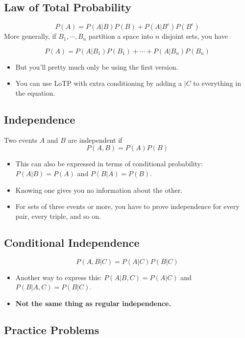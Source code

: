 \documentclass{article}
\begin{document}
\subsection{Law of Total Probability}

$$P(A) = P(A|B)P(B) + P(A|B^c)P(B^c)$$
More generally, if $B_1, \cdots, B_n$ partition a space into $n$ disjoint sets, you have 

$$P(A) = P(A|B_1)P(B_1) + \cdots + P(A|B_n)P(B_n)$$
\begin{itemize}
    \item But you'll pretty much only be using the first version.
    \item You can use LoTP with extra conditioning by adding a $|C$ to everything in the equation.
\end{itemize}

\subsection{Independence}

Two events $A$ and $B$ are independent if $$P(A, B) = P(A)P(B)$$

\begin{itemize}
    \item This can also be expressed in terms of conditional probability: $P(A|B) = P(A)$ and $P(B|A) = P(B)$.
    \item Knowing one gives you no information about the other.
    \item For sets of three events or more, you have to prove independence for every pair, every triple, and so on.
\end{itemize}

\subsection{Conditional Independence}

$$P(A, B|C) = P(A|C)P(B|C)$$
\begin{itemize}
    \item Another way to express this: $P(A|B, C) = P(A|C)$ and $P(B|A, C) = P(B|C)$.
    \item \textbf{Not the same thing as regular independence.}
\end{itemize}

\subsection{Practice Problems}
\end{document}
